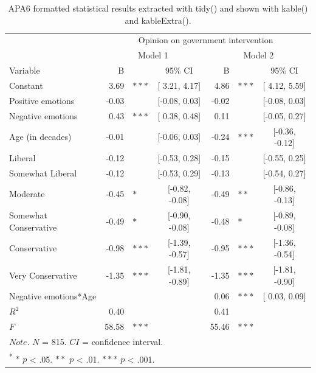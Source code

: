 \documentclass[doc,floatsintext]{apa6}
\begin{document}
\begin{table}[!h]

\caption{\label{tab:regressiontablecustom2}APA6 formatted statistical results extracted with tidy() and 
                 shown with kable() and kableExtra().}
\centering
\begin{tabular}[t]{lrlcrlc}
\toprule
\multicolumn{1}{c}{ } & \multicolumn{6}{c}{Opinion on government intervention} \\
\cmidrule(l{3pt}r{3pt}){2-7}
\multicolumn{1}{c}{ } & \multicolumn{3}{c}{Model 1} & \multicolumn{3}{c}{Model 2} \\
\cmidrule(l{3pt}r{3pt}){2-4} \cmidrule(l{3pt}r{3pt}){5-7}
Variable & B &  & 95\% CI & B &  & 95\% CI\\
\midrule
Constant & 3.69 & $***$ & [ 3.21,  4.17] & 4.86 & $***$ & [ 4.12,  5.59]\\
Positive emotions & -0.03 &  & [-0.08,  0.03] & -0.02 &  & [-0.08,  0.03]\\
Negative emotions & 0.43 & $***$ & [ 0.38,  0.48] & 0.11 &  & [-0.05,  0.27]\\
Age (in decades) & -0.01 &  & [-0.06,  0.03] & -0.24 & $***$ & [-0.36, -0.12]\\
Liberal & -0.12 &  & [-0.53,  0.28] & -0.15 &  & [-0.55,  0.25]\\
\addlinespace
Somewhat Liberal & -0.12 &  & [-0.53,  0.29] & -0.13 &  & [-0.54,  0.27]\\
Moderate & -0.45 & $*$ & [-0.82, -0.08] & -0.49 & $**$ & [-0.86, -0.13]\\
Somewhat Conservative & -0.49 & $*$ & [-0.90, -0.08] & -0.48 & $*$ & [-0.89, -0.08]\\
Conservative & -0.98 & $***$ & [-1.39, -0.57] & -0.95 & $***$ & [-1.36, -0.54]\\
Very Conservative & -1.35 & $***$ & [-1.81, -0.89] & -1.35 & $***$ & [-1.81, -0.90]\\
\addlinespace
Negative emotions*Age &  &  &  & 0.06 & $***$ & [ 0.03,  0.09]\\
$R^2$ & 0.40 &  &  & 0.41 &  & \\
$F$ & 58.58 & $***$ &  & 55.46 & $***$ & \\
\bottomrule
\multicolumn{7}{l}{$Note$. $N$ = 815. $CI$ = confidence interval.}\\
\multicolumn{7}{l}{\textsuperscript{*} $*$ $p$ < .05. $**$ $p$ < .01. $***$ $p$ < .001.}\\
\end{tabular}
\end{table}
\end{document}
